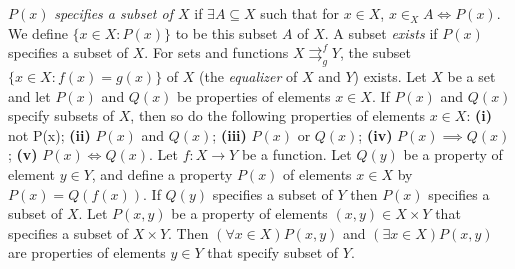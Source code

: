 $P(x)$ \textit{specifies a subset of $X$} if $\exists A \subseteq X$ such that for $x \in X$, $x \in_X A \iff P(x)$. We define $\{x \in X \colon P(x) \}$ to be this subset $A$ of $X$. A subset \textit{exists} if $P(x)$ specifies a subset of $X$.
 For sets and functions $X \rightrightarrows^f_g Y$, the subset $\{x \in X \colon f(x) = g(x) \}$ of $X$ (the \textit{equalizer} of $X$ and $Y$) exists.
 Let $X$ be a set and let $P(x)$ and $Q(x)$ be properties of elements $x \in X$. If $P(x)$ and $Q(x)$ specify subsets of $X$, then so do the following properties of elements $x \in X$: \textbf{(i)} not P(x); \textbf{(ii)} $P(x)$ and $Q(x)$; \textbf{(iii)} $P(x)$ or $Q(x)$; \textbf{(iv)} $P(x) \implies Q(x)$; \textbf{(v)} $P(x) \iff Q(x)$.
 Let $f \colon X \to Y$ be a function. Let $Q(y)$ be a property of element $y \in Y$, and define a property $P(x)$ of elements $x \in X$ by $P(x) = Q(f(x))$. If $Q(y)$ specifies a subset of $Y$ then $P(x)$ specifies a subset of $X$.
 Let $P(x, y)$ be a property of elements $(x, y) \in X \times Y$ that specifies a subset of $X \times Y$. Then $(\forall x \in X)P(x, y)$ and $(\exists x \in X)P(x, y)$ are properties of elements $y \in Y$ that specify subset of $Y$.
